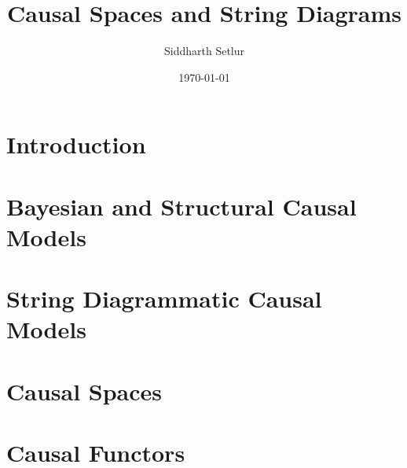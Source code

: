 \documentclass[a4paper]{article}
\title{Causal Spaces and String Diagrams}
\author{Siddharth Setlur }
\date{\today}
\theoremstyle{plain}
\theoremstyle{remark}
\theoremstyle{remark}
\theoremstyle{remark}
\begin{document}
    \maketitle
	



	\section{Introduction}\label{sec:intro}
		
	\section{Bayesian and Structural Causal Models}\label{sec:structural-causal-models}
		
	\section{String Diagrammatic Causal Models}
		
	\section{Causal Spaces}\label{sec:causal-spaces}
		
	\section{Causal Functors}\label{sec:causal-functors}
		
	\nocite{*}
	\printbibliography
\end{document}
